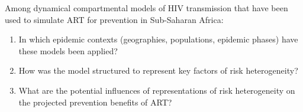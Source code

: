 Among dynamical compartmental models of HIV transmission
that have been used to simulate ART for prevention in Sub-Saharan Africa:
\begin{enumerate}
\item In which epidemic contexts (geographies, populations, epidemic phases)
      have these models been applied?
\item How was the model structured to represent key factors of risk heterogeneity?
\item What are the potential influences of representations of risk heterogeneity
      on the projected prevention benefits of ART?
\end{enumerate}